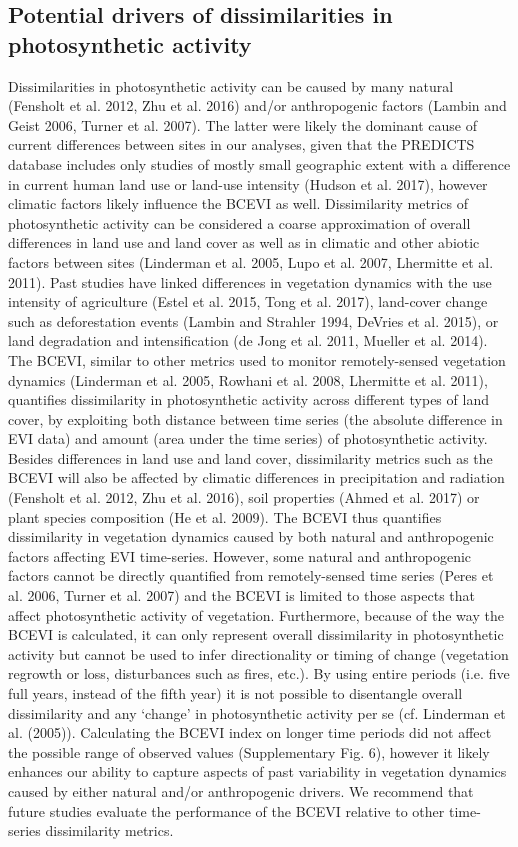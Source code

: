 \subsection{Potential drivers of dissimilarities in photosynthetic activity}
Dissimilarities in photosynthetic activity can be caused by many natural (Fensholt et al. 2012, Zhu et al. 2016) and/or anthropogenic factors (Lambin and Geist 2006, Turner et al. 2007). The latter were likely the dominant cause of current differences between sites in our analyses, given that the PREDICTS database includes only studies of mostly small geographic extent with a difference in current human land use or land-use intensity (Hudson et al. 2017), however climatic factors likely influence the BCEVI as well. Dissimilarity metrics of photosynthetic activity can be considered a coarse approximation of overall differences in land use and land cover as well as in climatic and other abiotic factors between sites (Linderman et al. 2005, Lupo et al. 2007, Lhermitte et al. 2011). Past studies have linked differences in vegetation dynamics with the use intensity of agriculture (Estel et al. 2015, Tong et al. 2017), land-cover change such as deforestation events (Lambin and Strahler 1994, DeVries et al. 2015), or land degradation and intensification (de Jong et al. 2011, Mueller et al. 2014). The BCEVI, similar to other metrics used to monitor remotely-sensed vegetation dynamics (Linderman et al. 2005, Rowhani et al. 2008, Lhermitte et al. 2011), quantifies dissimilarity in photosynthetic activity across different types of land cover, by exploiting both distance between time series (the absolute difference in EVI data) and amount (area under the time series) of photosynthetic activity. Besides differences in land use and land cover, dissimilarity metrics such as the BCEVI will also be affected by climatic differences in precipitation and radiation (Fensholt et al. 2012, Zhu et al. 2016), soil properties (Ahmed et al. 2017) or plant species composition (He et al. 2009). The BCEVI thus quantifies dissimilarity in vegetation dynamics caused by both natural and anthropogenic factors affecting EVI time-series.
	However, some natural and anthropogenic factors cannot be directly quantified from remotely-sensed time series (Peres et al. 2006, Turner et al. 2007) and the BCEVI is limited to those aspects that affect photosynthetic activity of vegetation. Furthermore, because of the way the BCEVI is calculated, it can only represent overall dissimilarity in photosynthetic activity but cannot be used to infer directionality or timing of change (vegetation regrowth or loss, disturbances such as fires, etc.). By using entire periods (i.e. five full years, instead of the fifth year) it is not possible to disentangle overall dissimilarity and any ‘change’ in photosynthetic activity per se (cf. Linderman et al. (2005)). Calculating the BCEVI index on longer time periods did not affect the possible range of observed values (Supplementary Fig. 6), however it likely enhances our ability to capture aspects of past variability in vegetation dynamics caused by either natural and/or anthropogenic drivers. We recommend that future studies evaluate the performance of the BCEVI relative to other time-series dissimilarity metrics. 

